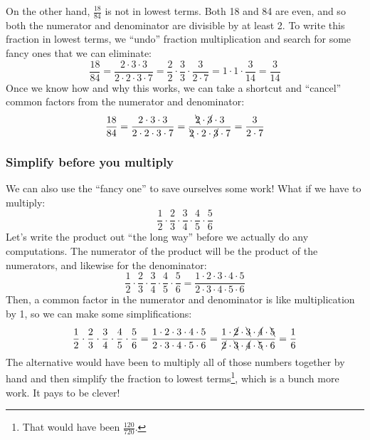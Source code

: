 On the other hand, $\frac{18}{84}$ is not in lowest terms. Both 18 and 84 are even, and so both the numerator and denominator are divisible by at least 2. To write this fraction in lowest terms, we ``undo'' fraction multiplication and search for some fancy ones that we can eliminate: \[\frac{18}{84} = \frac{2 \cdot 3 \cdot 3}{2 \cdot 2 \cdot 3 \cdot 7}  = \frac{2}{2}\cdot\frac{3}{3}\cdot\frac{3}{2\cdot 7} = 1\cdot1\cdot\frac{3}{14} = \frac{3}{14}\]
Once we know how and why this works, we can take a shortcut and ``cancel'' common factors from the numerator and denominator: \[\frac{18}{84} = \frac{2 \cdot 3 \cdot 3}{2 \cdot 2 \cdot 3 \cdot 7}=\frac{\bcancel{2} \cdot \cancel{3} \cdot 3}{\bcancel{2} \cdot 2 \cdot \cancel{3} \cdot 7}  = \frac{3}{2 \cdot 7}\]

\subsubsection{Simplify before you multiply}

We can also use the ``fancy one'' to save ourselves some work! What if we have to multiply:
\[\frac{1}{2} \cdot \frac{2}{3} \cdot \frac{3}{4} \cdot \frac{4}{5} \cdot \frac{5}{6}\]
Let's write the product out ``the long way'' before we actually do any computations. The numerator of the product will be the product of the numerators, and likewise for the denominator:
\[\frac{1}{2} \cdot \frac{2}{3} \cdot \frac{3}{4} \cdot \frac{4}{5} \cdot \frac{5}{6} = \frac{1 \cdot 2 \cdot 3 \cdot 4 \cdot 5}{2 \cdot 3 \cdot 4 \cdot 5 \cdot 6}\]
Then, a common factor in the numerator and denominator is like multiplication by 1, so we can make some simplifications:
\[\frac{1}{2} \cdot \frac{2}{3} \cdot \frac{3}{4} \cdot \frac{4}{5} \cdot \frac{5}{6} = \frac{1 \cdot 2 \cdot 3 \cdot 4 \cdot 5}{2 \cdot 3 \cdot 4 \cdot 5 \cdot 6} = \frac{1 \cdot \cancel{2} \cdot \bcancel{3} \cdot \cancel{4} \cdot \bcancel{5}}{\cancel{2} \cdot \bcancel{3} \cdot \cancel{4} \cdot \bcancel{5} \cdot 6} = \frac{1}{6}\]
The alternative would have been to multiply all of those numbers together by hand and then simplify the fraction to lowest terms\footnote{That would have been $\frac{120}{720}$.}, which is a bunch more work. It pays to be clever!


